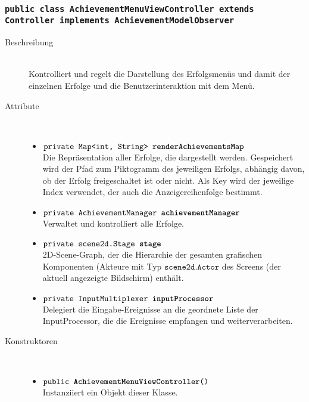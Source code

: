 
\subsubsection{\normalfont \texttt{public class \textbf{AchievementMenuViewController} extends Controller implements AchievementModelObserver}}

\begin{description}
\item[Beschreibung] \hfill \\ Kontrolliert und regelt die Darstellung des Erfolgsmenüs und damit der einzelnen Erfolge und die Benutzerinteraktion mit dem Menü.
\item[Attribute] \hfill \\
	\vspace{-.8cm}
	\begin{itemize}
		\item $\texttt{private Map<int, String> \textbf{renderAchievementsMap}}$ \\ Die Repräsentation aller Erfolge, die dargestellt werden. Gespeichert wird der Pfad zum Piktogramm des jeweiligen Erfolgs, abhängig davon, ob der Erfolg freigeschaltet ist oder nicht. Als Key wird der jeweilige Index verwendet, der auch die Anzeigereihenfolge bestimmt.
		\item $\texttt{private AchievementManager \textbf{achievementManager}}$ \\ Verwaltet und kontrolliert alle Erfolge.
		\item $\texttt{private scene2d.Stage \textbf{stage}}$ \\ 2D-Scene-Graph, der die Hierarchie der gesamten grafischen Komponenten (Akteure mit Typ $\texttt{scene2d.Actor}$ des Screens (der aktuell angezeigte Bildschirm) enthält. 
		\item $\texttt{private InputMultiplexer \textbf{inputProcessor}}$ \\ Delegiert die Eingabe-Ereignisse an die geordnete Liste der InputProcessor, die die Ereignisse empfangen und weiterverarbeiten.
	\end{itemize}
	
\item[Konstruktoren] \hfill \\
	\vspace{-.8cm}
	\begin{itemize}
		\item $\texttt{public \textbf{AchievementMenuViewController}()}$ \\ Instanziiert ein Objekt dieser Klasse.
	\end{itemize}
	

\end{description}
